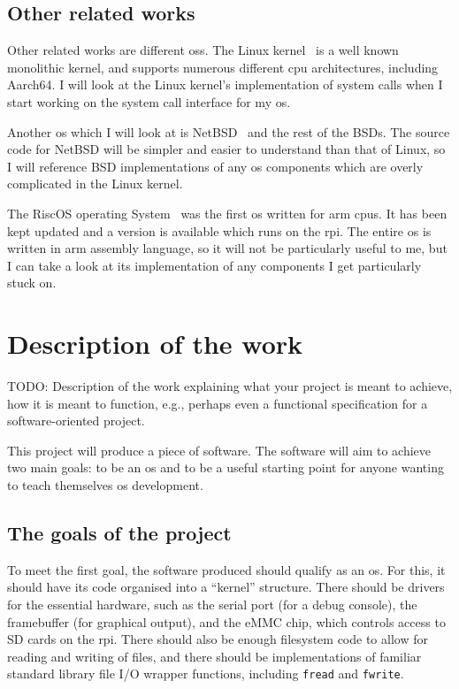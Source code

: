 \documentclass{article}
\begin{document}
\begin{refsection}
\subsection{Other related works}

Other related works are different \glspl{os}. The Linux
kernel~\cite{linux-kernel-git} is a well known monolithic kernel, and supports
numerous different \gls{cpu} architectures, including Aarch64. I will look at
the Linux kernel's implementation of system calls when I start working on the
system call interface for my \gls{os}.

Another \gls{os} which I will look at is NetBSD~\cite{netBSD-git} and the rest
of the BSDs. The source code for NetBSD will be simpler and easier to
understand than that of Linux, so I will reference BSD implementations of any
\gls{os} components which are overly complicated in the Linux kernel.

The RiscOS operating System~\cite{riscOS-source} was the first \gls{os} written
for \gls{arm} \glspl{cpu}. It has been kept updated and a version is available
which runs on the \gls{rpi}. The entire \gls{os} is written in \gls{arm}
assembly language, so it will not be particularly useful to me, but I can take
a look at its implementation of any components I get particularly stuck on.

\printbibliography[heading=relworks]

\end{refsection}

\section{Description of the work}
TODO: Description of the work explaining what your project is meant to achieve,
how it is meant to function, e.g., perhaps even a functional specification for
a software-oriented project.

This project will produce a piece of software. The software will aim to achieve
two main goals: to be an \gls{os} and to be a useful starting point for anyone
wanting to teach themselves \gls{os} development.

\subsection{The goals of the project}
To meet the first goal, the software produced should qualify as an \gls{os}.
For this, it should have its code organised into a ``kernel'' structure. There
should be drivers for the essential hardware, such as the serial port (for a
debug console), the framebuffer (for graphical output), and the eMMC chip,
which controls access to SD cards on the \gls{rpi}. There should also be enough
filesystem code to allow for reading and writing of files, and there should be
implementations of familiar standard library file I/O wrapper functions,
including \texttt{fread} and \texttt{fwrite}.
\end{document}
